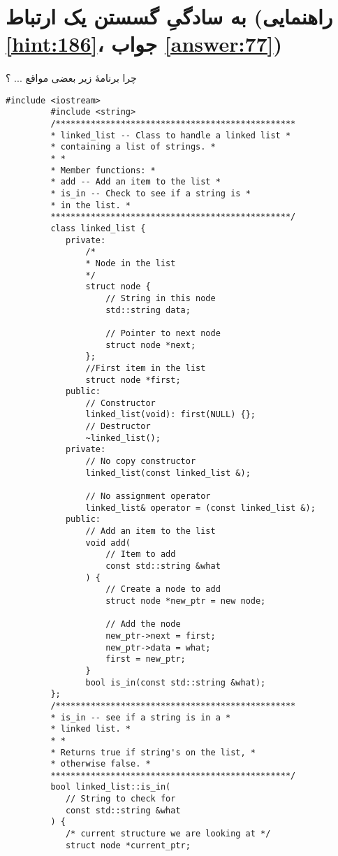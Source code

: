\section[به سادگیِ گسستن یک ارتباط]{به سادگیِ گسستن یک ارتباط \protect{} (راهنمایی \ref{hint:186}، جواب \ref{answer:77})}
\paragraph{}\label{prog:49}
چرا برنامهٔ زیر بعضی مواقع ... ؟

\begin{LTR}
    \begin{lstlisting}[style=C++Style]
         #include <iostream>
         #include <string>
         /************************************************
         * linked_list -- Class to handle a linked list *
         * containing a list of strings. *
         * *
         * Member functions: *
         * add -- Add an item to the list *
         * is_in -- Check to see if a string is *
         * in the list. *
         ************************************************/
         class linked_list {
         	private:
         		/*
         		* Node in the list
         		*/
         		struct node {
         			// String in this node
         			std::string data;

         			// Pointer to next node
         			struct node *next;
         		};
         		//First item in the list
         		struct node *first;
         	public:
         		// Constructor
         		linked_list(void): first(NULL) {};
         		// Destructor
         		~linked_list();
         	private:
         		// No copy constructor
         		linked_list(const linked_list &);

         		// No assignment operator
         		linked_list& operator = (const linked_list &);
         	public:
         		// Add an item to the list
         		void add(
         			// Item to add
         			const std::string &what
         		) {
         			// Create a node to add
         			struct node *new_ptr = new node;

         			// Add the node
         			new_ptr->next = first;
         			new_ptr->data = what;
         			first = new_ptr;
         		}
         		bool is_in(const std::string &what);
         };
         /************************************************
         * is_in -- see if a string is in a *
         * linked list. *
         * *
         * Returns true if string's on the list, *
         * otherwise false. *
         ************************************************/
         bool linked_list::is_in(
         	// String to check for
         	const std::string &what
         ) {
         	/* current structure we are looking at */
         	struct node *current_ptr;


\end{lstlisting}
\end{LTR}
